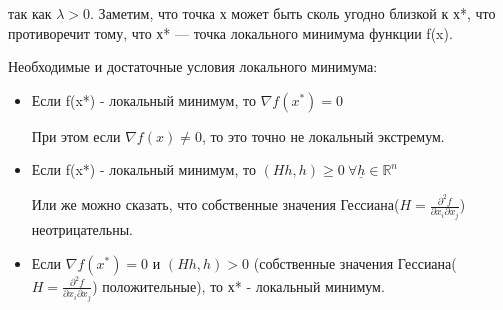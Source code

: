 \documentclass[a4paper, 12pt]{article}
\begin{document}
	так как $\lambda > 0$. Заметим, что точка х может быть сколь угодно близкой к х*, что противоречит тому, что х* — точка локального минимума функции f(x).
	
	Необходимые и достаточные условия локального минимума:
	
	\begin{itemize}
		\item Если f(x*) - локальный минимум, то $\nabla f(x^*) = 0$
		
		При этом если $\nabla f(x) \neq 0$, то это точно не локальный экстремум.
		
		\item  Если f(x*) - локальный минимум, то $(Hh, h) \geq 0 \: \forall \underline{h} \in \mathbb {R}^{n}$
		
		Или же можно сказать, что собственные значения Гессиана($H = \frac{\partial^2 f}{\partial x_i \partial x_j}$) неотрицательны. 
		
		\item Если $\nabla f(x^*) = 0$ и $(Hh, h) > 0$ (собственные значения Гессиана($H = \frac{\partial^2 f}{\partial x_i \partial x_j}$) положительные), то х* - локальный минимум.
		
	\end{itemize}
	
\end{document}
